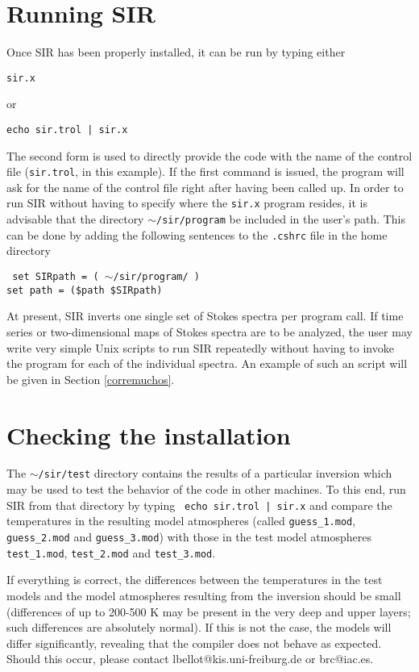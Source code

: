 \section{Running SIR}
Once SIR has been properly installed, it can be run by typing either 
\begin{flushleft}
{\tt sir.x}
\end{flushleft}
 or 
\begin{flushleft}
{\tt echo sir.trol | sir.x} 
\end{flushleft} 
The second form is used to directly provide the code with the name of
the control file ({\tt sir.trol}, in this example). If the first
command is issued, the program will ask for the name of the control
file right after having been called up. In order to run SIR without
having to specify where the {\tt sir.x} program resides, it is
advisable that the directory {\tt $\sim$/sir/program} be included in the
user's path. This can be done by adding the following sentences to the
{\tt .cshrc} file in the home directory
\begin{flushleft}
\tt
set SIRpath    = ( $\sim$/sir/program/ ) \\
set path    = (\$path \$SIRpath)
\end{flushleft}

At present, SIR inverts one single set of Stokes spectra per program 
call. If time series or two-dimensional maps of Stokes spectra are to 
be analyzed, the user may write very simple Unix scripts to run SIR 
repeatedly without having to invoke the program for each of the 
individual spectra. An example of such an script will be given 
in Section \ref{corremuchos}.

\section{Checking the installation}
The {\tt $\sim$/sir/test} directory contains the results of a particular
inversion which may be used to test the behavior of the code in other
machines. To this end, run SIR from that directory by typing {\tt 
echo sir.trol | sir.x} and compare the temperatures in the resulting 
model atmospheres (called {\tt guess\_1.mod}, {\tt guess\_2.mod} and 
{\tt guess\_3.mod}) with those in the test model atmospheres 
{\tt test\_1.mod}, {\tt test\_2.mod} and {\tt test\_3.mod}. 

If everything is correct, the differences between the temperatures
in the test models and the model atmospheres resulting from the
inversion should be small (differences of up to 200-500 K may be
present in the very deep and upper layers; such differences are
absolutely normal). If this is not the case, the models will differ 
significantly, revealing that the compiler does not behave as 
expected. Should this occur, please contact 
lbellot@kis.uni-freiburg.de or brc@iac.es.  

